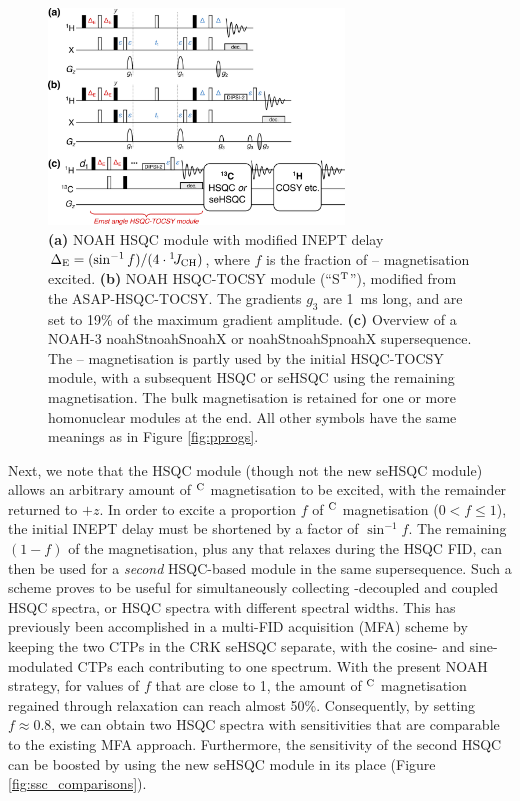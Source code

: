 \documentclass[11pt]{article}
\newcommand*{\noahthree}[3]{\csname noah#1\endcsname\csname noah#2\endcsname\csname noah#3\endcsname}
\newcommand*{\noahSt}{S$\rm ^T$}
\newcommand*{\hl}[1]{\textcolor{WildStrawberry}{#1}}
\newcommand*{\carbon}{\ce{^{13}C}}
\newcommand*{\proton}{\ce{^{1}H}}
\newcommand*{\onejch}{{}^{1}\!J_{\ce{CH}}}
\newcommand*{\magn}[1]{\ce{^1H}$^{#1}$}
\newcommand*{\figref}[1]{Figure \ref{fig:#1}}
\begin{document}


\begin{figure}
    \centering
    \includegraphics[width=0.7\textwidth]{pprogs_hsqct.png}
    \caption{
        \textbf{(a)} NOAH HSQC module with modified INEPT delay $\Delta_{\mathrm{E}} = (\sin^{-1} f)/(4\cdot\onejch)$, where $f$ is the fraction of \carbon{}--\proton{} magnetisation excited.
        \textbf{(b)} NOAH HSQC-TOCSY module (``\noahSt{}''), modified from the ASAP-HSQC-TOCSY.\autocite{Becker2019JMR}
        The gradients $g_3$ are \SI{1}{\ms} long, and are set to 19\% of the maximum gradient amplitude.
        \textbf{(c)} Overview of a NOAH-3 \noahthree{St}{S}{X} or \noahthree{St}{Sp}{X} supersequence.
        The \carbon{}--\proton{} magnetisation is partly used by the initial HSQC-TOCSY module, with a subsequent HSQC or seHSQC using the remaining magnetisation.
        The bulk magnetisation is retained for one or more homonuclear modules at the end.
        All other symbols have the same meanings as in \figref{pprogs}.
    }
    \label{fig:pprogs_hsqct}
\end{figure}

Next, we note that the HSQC module (though not the new seHSQC module) allows an arbitrary amount of \magn{\ce{C}} magnetisation to be excited, with the remainder returned to $+z$.  In order to excite a proportion $f$ of \magn{\ce{C}} magnetisation ($0 < f \leq 1$), the initial INEPT delay must be shortened by a factor of $\sin^{-1}f$.
The remaining $(1 - f)$ of the magnetisation, plus any that relaxes during the HSQC FID, can then be used for a \textit{second} HSQC-based module in the same supersequence.
Such a scheme proves to be useful for simultaneously collecting \carbon{}-decoupled and coupled HSQC spectra, or HSQC spectra with different spectral widths.
This has previously been accomplished in a multi-FID acquisition (MFA) scheme by keeping the two CTPs in the CRK seHSQC separate, with the cosine- and sine-modulated CTPs each contributing to one spectrum.\autocite{ctphsqc}
\hl{
With the present NOAH strategy, for values of $f$ that are close to 1, the amount of \magn{\ce{C}} magnetisation regained through relaxation can reach almost 50\%.
Consequently, by setting $f \approx 0.8$, we can obtain two HSQC spectra with sensitivities that are comparable to the existing MFA approach.
Furthermore, the sensitivity of the second HSQC can be boosted by using the new seHSQC module in its place (\figref{ssc_comparisons}).
}
\end{document}
